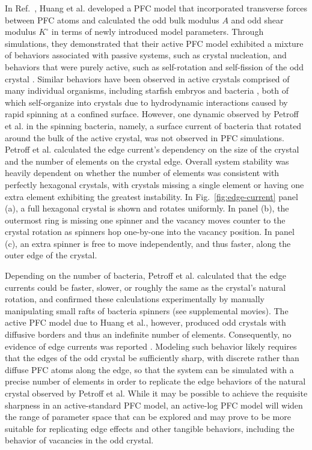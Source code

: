 In Ref.~\cite{huang2025anomalous}, Huang et al. developed a PFC model that incorporated transverse forces between PFC atoms and calculated the odd bulk modulus $A$ and odd shear modulus $K^\circ$ in terms of newly introduced model parameters.  Through simulations, they demonstrated that their active PFC model exhibited a mixture of behaviors associated with passive systems, such as crystal nucleation, and behaviors that were purely active, such as self-rotation and self-fission of the odd crystal \cite{huang2025anomalous}.  Similar behaviors have been observed in active crystals comprised of many individual organisms, including starfish embryos \cite{tan2022odd} and bacteria \cite{petroff2015fast}, both of which self-organize into crystals due to hydrodynamic interactions caused by rapid spinning at a confined surface.  However, one dynamic observed by Petroff et al. in the spinning bacteria, namely, a surface current of bacteria that rotated around the bulk of the active crystal, was not observed in PFC simulations.  Petroff et al. calculated the edge current's dependency on the size of the crystal and the number of elements on the crystal edge.  Overall system stability was heavily dependent on whether the number of elements was consistent with perfectly hexagonal crystals, with crystals missing a single element or having one extra element exhibiting the greatest instability.  In Fig.~\ref{fig:edge-current} panel (a), a full hexagonal crystal is shown and rotates uniformly.  In panel (b), the outermost ring is missing one spinner and the vacancy moves counter to the crystal rotation as spinners hop one-by-one into the vacancy position.  In panel (c), an extra spinner is free to move independently, and thus faster, along the outer edge of the crystal.

Depending on the number of bacteria, Petroff et al. calculated that the edge currents could be faster, slower, or roughly the same as the crystal's natural rotation, and confirmed these calculations experimentally by manually manipulating small rafts of bacteria spinners \cite{petroff2015fast} (see supplemental movies).  The active PFC model due to Huang et al., however, produced odd crystals with diffusive borders and thus an indefinite number of elements.  Consequently, no evidence of edge currents was reported \cite{huang2025anomalous}.  Modeling such behavior likely requires that the edges of the odd crystal be sufficiently sharp, with discrete rather than diffuse PFC atoms along the edge, so that the system can be simulated with a precise number of elements in order to replicate the edge behaviors of the natural crystal observed by Petroff et al.  While it may be possible to achieve the requisite sharpness in an active-standard PFC model, an active-log PFC model will widen the range of parameter space that can be explored and may prove to be more suitable for replicating edge effects and other tangible behaviors, including the behavior of vacancies in the odd crystal.

